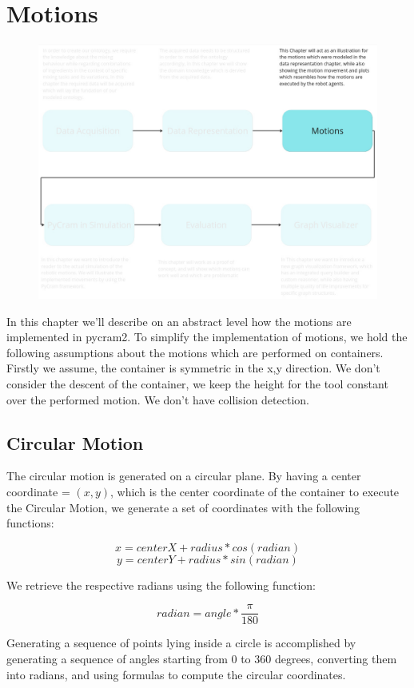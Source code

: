 \chapter{Motions}
\label{chap:Motions}
\begin{figure}[H]
    \includegraphics[scale=0.3]{Graphics/overview_3.jpg}
\end{figure}
In this chapter we'll describe on an abstract level how the motions are implemented in pycram2.
To simplify the implementation of motions, we hold the following assumptions about the motions which are performed on containers.
Firstly we assume, the container is symmetric in the x,y direction. We don't consider the descent of the container, we keep the height for the tool
constant over the performed motion. We don't have collision detection.

\section{Circular Motion}
The circular motion is generated on a circular plane. 
By having a center coordinate = $(x,y)$, which is the center coordinate of 
the container to execute the Circular Motion, we generate a set of coordinates
with the following functions: 

\[x = centerX + radius * cos(radian)\]
\[y = centerY + radius * sin(radian)\]

We retrieve the respective radians using the following function:

\[radian = angle * \frac{\pi}{180}\]

Generating a sequence of points lying inside a circle is accomplished by generating a sequence of angles starting from 0 to 360 degrees, 
converting them into radians, and using formulas to compute the circular coordinates.

